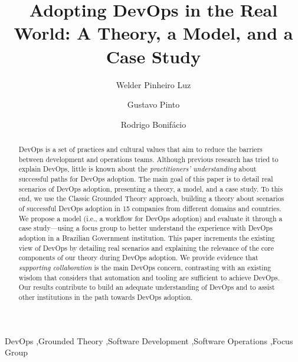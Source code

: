 \documentclass[preprint,12pt,3p]{elsarticle}
\begin{document}
\begin{frontmatter}

\title{Adopting DevOps in the Real World: A Theory, a Model, and a Case Study}

\author[label1]{Welder Pinheiro Luz}
\address[label1]{Brazilian Federal Court of Accounts}

\author[label2]{Gustavo Pinto}
\address[label2]{Federal University of Par\'a}

\author[label3]{Rodrigo Bonif\'acio}
\address[label3]{University of Bras\'{i}lia}

\begin{abstract}
DevOps is a set of practices and cultural values
that aim to reduce the barriers between development and operations
teams. Although previous research has tried to
explain DevOps, little is
known about the \emph{practitioners' understanding}
about successful paths for DevOps adoption. The main goal of this paper
is to detail real scenarios of DevOps adoption, presenting a theory, a model, and a case study.
To this end, we use the Classic Grounded Theory approach, building a theory about 
scenarios of successful DevOps adoption in 15 companies from different
domains and countries. We propose a model (i.e., a workflow for DevOps
adoption) and evaluate it through
a case study---using a focus group to
better understand the experience with DevOps adoption in a Brazilian
Government institution. This paper increments the existing view of
DevOps by detailing real scenarios and explaining the relevance
of the core components of our theory during DevOps adoption.
We provide evidence that \emph{supporting collaboration} is the main DevOps concern,
contrasting with an existing wisdom that considers that automation and tooling are
sufficient to achieve DevOps. Our results contribute to
build an adequate understanding of DevOps and
to assist other institutions in the path towards DevOps adoption.
\end{abstract}

\begin{keyword}
DevOps \sep Grounded Theory \sep Software Development \sep Software Operations \sep Focus Group
\end{keyword}

\end{frontmatter}
























\end{document}
